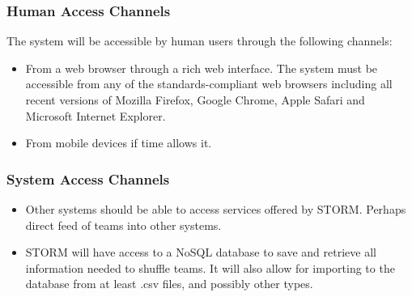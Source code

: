 \subsubsection{Human Access Channels}
The system will be accessible by human users through the following channels:\par
\begin{itemize}
\item From a web browser through a rich web interface. The system must be accessible from any of the standards-compliant web browsers including all recent versions of Mozilla Firefox, Google Chrome, Apple Safari and Microsoft Internet Explorer.
\item From mobile devices if time allows it.
\end{itemize}
\subsubsection{System Access Channels}
\begin{itemize}
\item Other systems should be able to access services offered by STORM. Perhaps direct feed of teams into other systems.
\item STORM will have access to a NoSQL database to save and retrieve all information needed to shuffle teams. It will also allow for importing to the database from at least .csv files, and possibly other types.
\end{itemize}